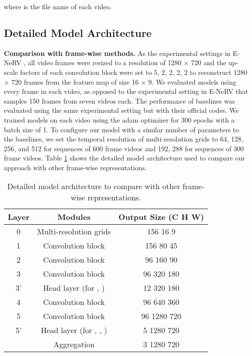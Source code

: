 \documentclass[sigconf]{acmart}
\begin{document}
\noindent where  is the file name of each video.

\subsection{Detailed Model Architecture}
\noindent\textbf{Comparison with frame-wise methods.}
As the experimental settings in E-NeRV \cite{enerv},
all video frames were resized to a resolution of 1280 × 720 and the up-scale factors of each convolution block were set to 5, 2, 2, 2, 2 to reconstruct 1280 × 720 frames from the feature map of size 16 × 9.
We evaluated models using every frame in each video, as opposed to the experimental setting in E-NeRV that samples 150 frames from seven videos each.
The performance of baselines was evaluated using the same experimental setting but with their official codes.
We trained models on each video using the adam optimizer for 300 epochs with a batch size of 1.
To configure our model with a similar number of parameters to the baselines, we set the temporal resolution of multi-resolution grids to 64, 128, 256, and 512 for sequences of 600 frame videos and 192, 288 for sequences of 300 frame videos.
Table \ref{fig_fw} shows the detailed model architecture used to compare our approach with other frame-wise representations.
\begin{table}[h]
\centering
\caption{Detailed model architecture to compare with other frame-wise representations.}
\vskip 0.1in
\begin{tabular}{c|c|c}
\hline
Layer & Modules                    & Output Size (C  H  W)    \\ \hline\hline
0     & Multi-resolution grids     & 156  16  9                 \\
1     & Convolution block                 & 156  80 45                \\
2     & Convolution block              & 96  160 90    \\
3     & Convolution block              & 96  320 180    \\
3'    & Head layer (for , )     & 12 320 180             \\
4     & Convolution block              & 96  640 360    \\
5     & Convolution block              & 96  1280 720 \\
5'    & Head layer (for , , ) & 5 1280 720  \\
& Aggregation & 3 1280 720 \\
\hline
\end{tabular}
\label{fig_fw}
\end{table}
\end{document}
